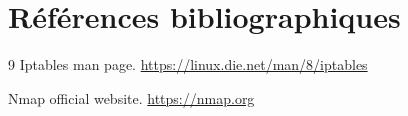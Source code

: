 \chapter*{Références bibliographiques}
\begin{thebibliography}{9}
    Iptables man page.
    \url{https://linux.die.net/man/8/iptables}

    Nmap official website.
    \url{https://nmap.org}
\end{thebibliography}
